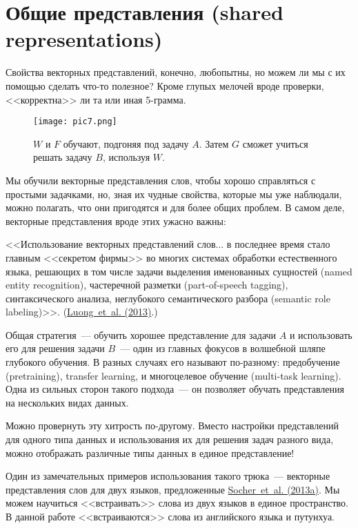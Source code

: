\documentclass[a4paper,12pt]{article}
\begin{document}
\section*{Общие представления (shared representations)}

Свойства векторных представлений, конечно, любопытны, но можем ли мы с их помощью сделать что-то полезное? Кроме глупых мелочей вроде проверки, <<корректна>> ли та или иная 5-грамма.

\begin{figure}[t]
\begin{center}
\texttt{[image: pic7.png]}
\caption{$W$ и $F$ обучают, подгоняя под задачу $A$. Затем $G$ сможет учиться решать задачу $B$, используя $W$.}
\end{center}
\end{figure}

Мы обучили векторные представления слов, чтобы хорошо справляться с простыми задачками, но, зная их чудные свойства, которые мы уже наблюдали, можно полагать, что они пригодятся и для более общих проблем. В самом деле, векторные представления вроде этих ужасно важны:

<<Использование векторных представлений слов... в последнее время стало главным <<секретом фирмы>> во многих системах обработки естественного языка, решающих в том числе задачи выделения именованных сущностей (named entity recognition), частеречной разметки (part-of-speech tagging), синтаксического анализа, неглубокого семантического разбора (semantic role labeling)>>. (\href{http://nlp.stanford.edu/~lmthang/data/papers/conll13_morpho.pdf}{Luong~et~al. (2013)}.)

Общая стратегия~--- обучить хорошее представление для задачи $A$ и использовать его для решения задачи $B$~--- один из главных фокусов в волшебной шляпе глубокого обучения. В разных случаях его называют по-разному: предобучение (pretraining),  transfer learning, и многоцелевое обучение (multi-task learning). Одна из сильных сторон такого подхода~--- он позволяет обучать представления на нескольких видах данных.

Можно провернуть эту хитрость по-другому. Вместо настройки представлений для одного типа данных и использования их для решения задач разного вида, можно отображать различные типы данных в единое представление!

Один из замечательных примеров использования такого трюка~--- векторные представления слов для двух языков, предложенные \href{http://ai.stanford.edu/~wzou/emnlp2013_ZouSocherCerManning.pdf}{Socher~et~al. (2013a)}. Мы можем научиться <<встраивать>> слова из двух языков в единое пространство. В данной работе <<встраиваются>> слова из английского языка и путунхуа.
\end{document}
